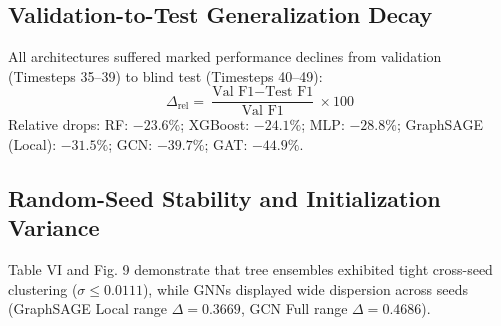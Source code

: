 \documentclass[conference]{IEEEtran}
\begin{document}
\begin{table}[htbp]
\centering
\caption{Class Loss Weighting Comparison (Full 165 Features)}
\label{tab:weight_comp}
{\small
{}
}
\end{table}

\subsection{Validation-to-Test Generalization Decay}
All architectures suffered marked performance declines from validation (Timesteps 35--39) to blind test (Timesteps 40--49):
\begin{equation}
\Delta_{\text{rel}} = \frac{\text{Val F1} - \text{Test F1}}{\text{Val F1}} \times 100
\label{eq:drop}
\end{equation}
Relative drops: RF: $-23.6\%$; XGBoost: $-24.1\%$; MLP: $-28.8\%$; GraphSAGE (Local): $-31.5\%$; GCN: $-39.7\%$; GAT: $-44.9\%$.

\subsection{Random-Seed Stability and Initialization Variance}
Table VI and Fig. 9 demonstrate that tree ensembles exhibited tight cross-seed clustering ($\sigma \le 0.0111$), while GNNs displayed wide dispersion across seeds (GraphSAGE Local range $\Delta = 0.3669$, GCN Full range $\Delta = 0.4686$).
\end{document}

